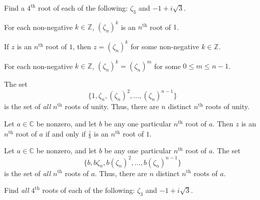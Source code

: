 \begin{problem}\label{prob.nthRoots}
Find a $4^\text{th}$ root of each of the following: $\zeta_3$ and $-1 + i\sqrt{3}$.
\end{problem}

\begin{theorem}
For each non-negative $k\in \mathbb{Z}$, $(\zeta_n)^k$ is an $n^\text{th}$ root of $1$.
\end{theorem}

\begin{lemma}\label{lem.nthRoot1IsPowerOfZeta}
If $z$ is an $n^\text{th}$ root of $1$, then $z = (\zeta_n)^k$ for some non-negative $k\in \mathbb{Z}$.
\end{lemma}

\begin{lemma}\label{lem.ReducePowerOfZeta}
For each non-negative $k\in \mathbb{Z}$, $(\zeta_n)^k = (\zeta_n)^m$ for some $0\le m \le n-1$.
\end{lemma}

\begin{theorem}\label{thm.nthRoots1}
The set \[\{1, \zeta_n, (\zeta_n)^2, \ldots, (\zeta_n)^{n-1}\}\] is the set of \emph{all} $n^\text{th}$ roots of unity. Thus, there are $n$ distinct $n^\text{th}$ roots of unity. 
\end{theorem}

\begin{lemma}
Let $a\in \mathbb{C}$ be nonzero, and let $b$ be any one particular $n^\text{th}$ root of $a$. Then $z$ is an $n^\text{th}$ root of $a$ if and only if $\frac{z}{b}$ is an $n^\text{th}$ root of $1$.
\end{lemma}

\begin{theorem}\label{thm.nthRoots}
Let $a\in \mathbb{C}$ be nonzero, and let $b$ be any one particular $n^\text{th}$ root of $a$. The set \[\{b, b\zeta_n, b(\zeta_n)^2, \ldots, b(\zeta_n)^{n-1}\}\] is the set of \emph{all} $n^\text{th}$ roots of $a$. Thus, there are $n$ distinct $n^\text{th}$ roots of $a$. 
\end{theorem}

\begin{problem}
Find \emph{all} $4^\text{th}$ roots of each of the following: $\zeta_3$ and $-1 + i\sqrt{3}$.
\end{problem}

